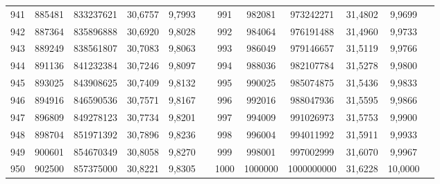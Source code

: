 \begin{longtable}{p{.17\linewidth}*{11}{S}}
941&885481&833237621&30,6757&9,7993&&991&982081&973242271&31,4802&9,9699\\
942&887364&835896888&30,6920&9,8028&&992&984064&976191488&31,4960&9,9733\\
943&889249&838561807&30,7083&9,8063&&993&986049&979146657&31,5119&9,9766\\
944&891136&841232384&30,7246&9,8097&&994&988036&982107784&31,5278&9,9800\\
945&893025&843908625&30,7409&9,8132&&995&990025&985074875&31,5436&9,9833\\
946&894916&846590536&30,7571&9,8167&&996&992016&988047936&31,5595&9,9866\\
947&896809&849278123&30,7734&9,8201&&997&994009&991026973&31,5753&9,9900\\
948&898704&851971392&30,7896&9,8236&&998&996004&994011992&31,5911&9,9933\\
949&900601&854670349&30,8058&9,8270&&999&998001&997002999&31,6070&9,9967\\
950&902500&857375000&30,8221&9,8305&&1000&1000000&1000000000&31,6228&10,0000\\
\end{longtable}
